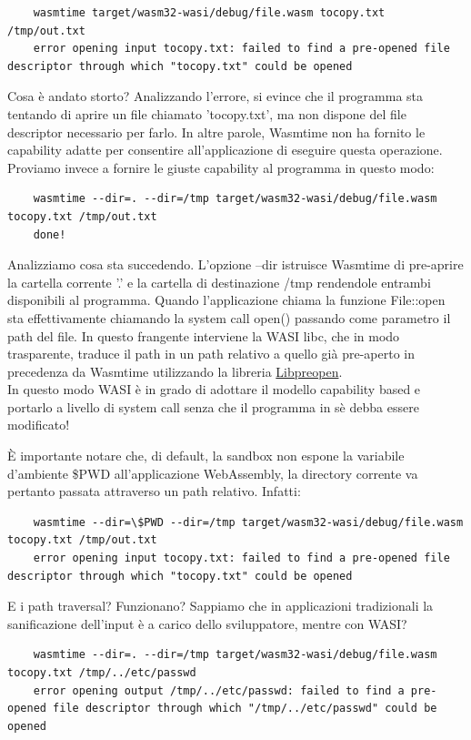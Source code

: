 \begin{lstlisting}
    wasmtime target/wasm32-wasi/debug/file.wasm tocopy.txt /tmp/out.txt
    error opening input tocopy.txt: failed to find a pre-opened file descriptor through which "tocopy.txt" could be opened
\end{lstlisting}
Cosa è andato storto? Analizzando l'errore, si evince che il programma sta tentando di aprire un file chiamato
'tocopy.txt', ma non dispone del file descriptor necessario per farlo. In altre parole, Wasmtime non ha fornito le
capability adatte per consentire all'applicazione di eseguire questa operazione. \\
Proviamo invece a fornire le giuste capability al programma in questo modo:
\begin{lstlisting}
    wasmtime --dir=. --dir=/tmp target/wasm32-wasi/debug/file.wasm tocopy.txt /tmp/out.txt
    done!
\end{lstlisting}
Analizziamo cosa sta succedendo. L'opzione --dir istruisce Wasmtime di pre-aprire la cartella corrente '.' e la cartella
di destinazione /tmp rendendole entrambi disponibili al programma. Quando l'applicazione chiama la funzione File::open
sta effettivamente chiamando la system call open() passando come parametro il path del file. In questo frangente
interviene la WASI libc, che in modo trasparente, traduce il path in un path relativo a quello già pre-aperto in
precedenza da Wasmtime utilizzando la libreria \hyperref[sec:libpreopen]{Libpreopen}. \\In questo modo WASI è in grado
di adottare il modello capability based e portarlo a livello di system call senza che il programma in sè debba essere
modificato!

È importante notare che, di default, la sandbox non espone la variabile d'ambiente \$PWD all'applicazione WebAssembly,
la directory corrente va pertanto passata attraverso un path relativo. Infatti:
\begin{lstlisting}
    wasmtime --dir=\$PWD --dir=/tmp target/wasm32-wasi/debug/file.wasm tocopy.txt /tmp/out.txt
    error opening input tocopy.txt: failed to find a pre-opened file descriptor through which "tocopy.txt" could be opened
\end{lstlisting}

E i path traversal? Funzionano? Sappiamo che in applicazioni tradizionali la sanificazione dell'input è a carico dello
sviluppatore, mentre con WASI?

\begin{lstlisting}
    wasmtime --dir=. --dir=/tmp target/wasm32-wasi/debug/file.wasm tocopy.txt /tmp/../etc/passwd
    error opening output /tmp/../etc/passwd: failed to find a pre-opened file descriptor through which "/tmp/../etc/passwd" could be opened
\end{lstlisting}

